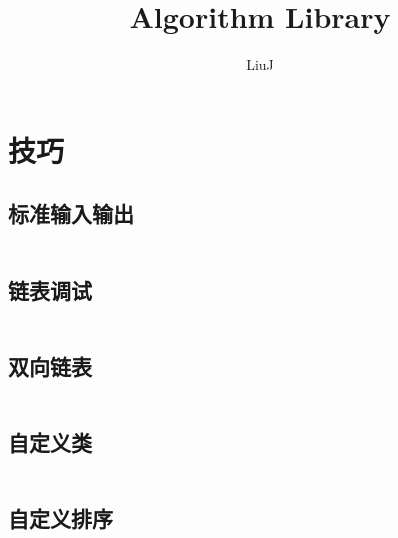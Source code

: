 \documentclass[a4paper,11pt]{article}
\author{LiuJ}
\title{Algorithm Library}
\begin{document}
 
\maketitle %
\newpage %
\tableofcontents %


\newpage
\section{技巧}

\subsection{标准输入输出}
\inputminted[linenos,autogobble]{java}{util/in-out.java}

\subsection{链表调试}
\inputminted[linenos,autogobble]{java}{util/linkedlist-debug.java}

\subsection{双向链表}
\inputminted[linenos,autogobble]{java}{util/double-linkedlist.java}

\subsection{自定义类}
\inputminted[linenos,autogobble]{java}{util/bind.java}

\subsection{自定义排序}
\inputminted[linenos,autogobble]{java}{util/sort-api.java}
\end{document}
